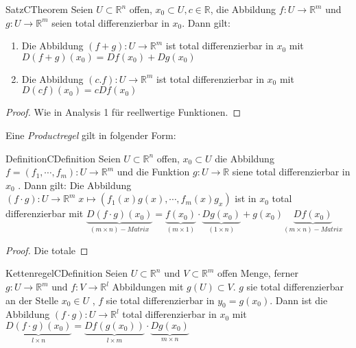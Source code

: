 	\begin{ibox}[33]{Satz}{CTheorem}
	    Seien $ U \subset \mathbb{R}^n  $ offen, $ x_0 \subset U, c \in \mathbb{R}  $, die Abbildung $ f:U \to \mathbb{R}^m $ 
		und $ g:U \to \mathbb{R}^m $ seien total differenzierbar in $ x_0 $. Dann gilt:
		\begin{enumerate}[label=\alph*)]
			\item Die Abbildung $ \left( f+g \right) : U \to \mathbb{R}^m  $ ist total differenzierbar in $ x_0 $ mit 
				$ D \left( f+g \right) (x_0) = Df\left( x_0 \right) + Dg\left( x_0 \right)  $ 
			\item Die Abbildung $ \left( c.f \right) : U \to \mathbb{R}^m $ ist total differenzierbar in $ x_0 $ mit 
				$ D\left( c f \right) (x_0) = c Df(x_0) $ 
		\end{enumerate}
	\end{ibox}
	\begin{proof}
		Wie in Analysis 1 für reellwertige Funktionen. 
	\end{proof}
Eine \textit{Productregel} gilt in folgender Form:
\begin{ibox}[34]{Definition}{CDefinition}
    Seien $ U \subset \mathbb{R}^n  $ offen, $ x_0 \subset U $ die Abbildung $ f = \left( f_1, \cdots, f_{m} \right) 
	:U \to \mathbb{R}^m$ und die Funktion $ g: U \to \mathbb{R}  $ siene total differenzierbar in $ x_0 $ . Dann gilt:
	Die Abbildung $ \left( f \cdot g \right) : U \to \mathbb{R}^m \; x \mapsto \left( f_1(x)g(x), \cdots, f_{m}(x)g_{x} \right) $ 
	ist in $ x_0 $ total differenzierbar mit $ \underbrace{ D \left( f \cdot g \right) (x_0)}_{(m\times n)-Matrix} =
	\underbrace{f\left( x_0 \right)}_{(m\times 1)} \cdot \underbrace{Dg(x_0)}_{(1\times n)} +
	g(x_0)\underbrace{ Df(x_0)}_{(m\times n )- Matrix}$
\end{ibox}

\begin{proof}
	Die totale  
\end{proof}

\begin{ibox}[35]{Kettenregel}{CDefinition}
    Seien $ U \subset \mathbb{R}^n \text{ und } V \subset \mathbb{R}^m  $ offen Menge, ferner $ g: U \to \mathbb{R}^m  \text{ und } 
	f:V \to \mathbb{R}^l $ Abbildungen mit $ g(U) \subset V  $. $ g $ sie total differenzierbar an der Stelle $ x_0 \in U $ 
	, $ f $ sie total differenzierbar in $ y_0 = g\left( x_0 \right)  $. Dann ist die Abbildung $ \left( f \cdot g \right) 
	:U \to \mathbb{R}^l  $ total differenzierbar in $ x_0 $ mit $ \underbrace{D \left( f \cdot g \right) (x_0) }_{l\times n}= 
	\underbrace{Df(g(x_0))}_{l \times m} \cdot \underbrace{Dg(x_0)}_{m \times n}$ 
\end{ibox}


